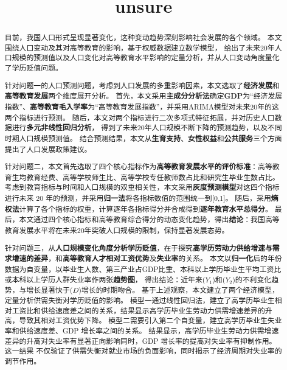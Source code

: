 \documentclass[withoutpreface,bwprint]{cumcmthesis} %
\title{unsure}
\begin{document}
\maketitle
\begin{abstract}

目前，我国人口形式呈现显著变化，这种变动趋势深刻影响社会发展的各个领域。
本文围绕人口变动及其对高等教育的影响，基于权威数据建立数学模型，
给出了未来20年人口规模的预测值以及人口变化对高等教育水平影响的定量分析，并从人口变动角度量化了学历贬值问题。

针对问题一的人口预测问题，考虑到人口发展的多重影响因素，本文选取了\textbf{经济发展}和\textbf{高等教育发展}两个维度展开分析。
首先，本文采用\textbf{主成分分析法}确定\textbf{GDP}为“经济发展指数”、\textbf{高等教育毛入学率}为“高等教育发展指数”，并采用ARIMA模型对未来20年的这两个指标进行预测。
随后，本文对两个指标进行二次多项式特征拓展，并对历史人口数据进行\textbf{多元非线性回归分析}，
得到了未来20年人口规模不断下降的预测趋势，以及不同时期人口规模预测值。
结合预测结果，本文从\textbf{生育支持}、\textbf{女性权益}和\textbf{公共服务}三个方面提出了人口发展政策建议。

针对问题二，本文首先选取了四个核心指标作为\textbf{高等教育发展水平的评价标准}：高等教育生均教育经费、高等学校师生比、高等学校专任教师数占比和研究生毕业生数占比。
考虑到教育指标与时间和人口规模的双重相关性，本文采用\textbf{灰度预测模型}对这四个指标进行未来 20 年的预测，并采用\textbf{归一法}将各指标数值的范围统一到[0,1]。
随后，采用\textbf{熵权法}计算了各个指标的权重，计算逐年各指标得分并合成得到\textbf{逐年教育水平总得分}。
最后，本文通过四个核心指标和高等教育综合得分的动态变化趋势，得出\textbf{结论}：我国高等教育发展水平将在未来20年突破人口规模的限制，保持显著发展态势。

针对问题三，从\textbf{人口规模变化角度分析学历贬值}，在于探究\textbf{高学历劳动力供给增速与需求增速的差异}，和\textbf{高等教育人才相对工资优势}及\textbf{失业率}的关系。
本文以\textbf{归一化}后的年份数据为自变量，以毕业生人数、第三产业占GDP比重、本科以上学历毕业生平均工资比或本科以上学历人群失业率作两张\textbf{趋势图}，
得出结论：近年来($Y_1$)和($Y_2$)的不利变化趋势，与增长显著快于($D$)增长的时期吻合。
基于上述观察，本文建立了两个经济模型，定量分析供需失衡对学历贬值的影响。
模型一通过线性回归法，建立了高学历毕业生相对工资比和供给速度差之间的关系，结果显示高学历毕业生劳动力供需增速差异的升高，导致其相对工资优势下降。
模型二需要引入第二个自变量，建立高学历毕业生失业率和供给速度差、GDP 增长率之间的关系。
结果显示，高学历毕业生劳动力供需增速差异的升高对失业率有显著正向影响同时，GDP 增长率的提高对失业率有抑制作用。这一结果
不仅验证了供需失衡对就业市场的负面影响，同时揭示了经济周期对失业率的调节作用。



\keywords{\quad \quad    } %

\end{abstract}
\end{document}
